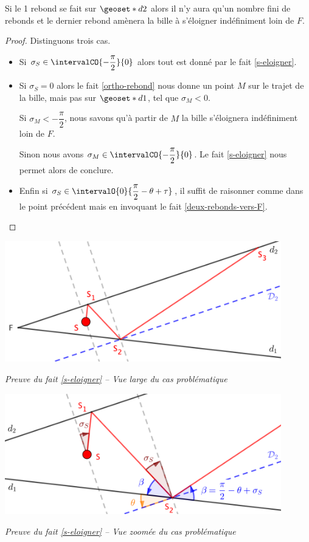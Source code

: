 \medskip


\begin{theorem}
	Si le 1\ier{} rebond se fait sur $\geoset*{d}{2}$ alors il n'y aura qu'un nombre fini de rebonds et le dernier rebond amènera la bille à s'éloigner indéfiniment loin de $F$.
\end{theorem}

\begin{proof}
	Distinguons trois cas.
	
	\begin{itemize}[label = \textbullet]
		\item Si $\sigma_S \in \intervalCO{- \dfrac{\pi}{2}}{0}$ alors tout est donné par le fait \ref{s-eloigner}.


		\item Si $\sigma_S = 0$ alors le fait \ref{ortho-rebond} nous donne un point $M$ sur le trajet de la bille, mais pas sur $\geoset*{d}{1}$, tel que $\sigma_M < 0$.
		
		\noindent
		Si $\sigma_M < - \dfrac{\pi}{2}$, nous savons qu'à partir de $M$ la bille s'éloignera indéfiniment loin de $F$.
		
		\noindent
		Sinon nous avons $\sigma_M \in \intervalCO{- \dfrac{\pi}{2}}{0}$.
		Le fait \ref{s-eloigner} nous permet alors de conclure.
		
		
		\item Enfin si $\sigma_S \in \intervalO{0}{\dfrac{\pi}{2} - \theta + \tau}$, il suffit de raisonner comme dans le point précédent mais en invoquant le fait \ref{deux-rebonds-vers-F}.
	\end{itemize}
\end{proof}

	
\medskip


\begin{center}
	\includegraphics[width=12cm]{basic-math-pool/proof-starting-with-d2-2-bounces-farway-from-F.png}

	\itshape\small
	Preuve du fait \ref{s-eloigner} -- Vue large du cas problématique
\end{center}

	
\medskip


\begin{center}
	\includegraphics[width=12cm]{basic-math-pool/proof-starting-with-d2-2-bounces-farway-from-F-zoom.png}

	\itshape\small
	Preuve du fait \ref{s-eloigner} -- Vue zoomée du cas problématique
\end{center}
